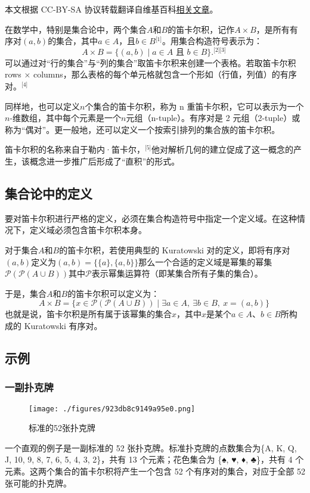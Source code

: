 
本文根据 CC-BY-SA 协议转载翻译自维基百科\href{https://en.wikipedia.org/wiki/Cartesian_product}{相关文章}。

在数学中，特别是集合论中，两个集合\(A\)和\(B\)的笛卡尔积，记作\( A \times B \)，是所有有序对\( (a, b) \)的集合，其中\( a \in A \)，且\( b \in B \)\(^\text{[1]}\)。用集合构造符号表示为：  
\[
A \times B = \{ (a, b) \mid a \in A \text{ 且 } b \in B \}.^\text{[2][3]}~
\]
可以通过对“行的集合”与“列的集合”取笛卡尔积来创建一个表格。若取笛卡尔积 rows × columns，那么表格的每个单元格就包含一个形如（行值，列值）的有序对。\(^\text{[4]}\)

同样地，也可以定义\(n\)个集合的笛卡尔积，称为 n 重笛卡尔积，它可以表示为一个\(n\)-维数组，其中每个元素是一个\(n\)元组（n-tuple）。有序对是 2 元组（2-tuple）或称为“偶对”。更一般地，还可以定义一个按索引排列的集合族的笛卡尔积。

笛卡尔积的名称来自于勒内·笛卡尔，\(^\text{[5]}\)他对解析几何的建立促成了这一概念的产生，该概念进一步推广后形成了“直积”的形式。
\subsection{集合论中的定义}
要对笛卡尔积进行严格的定义，必须在集合构造符号中指定一个定义域。在这种情况下，定义域必须包含笛卡尔积本身。

对于集合\( A \)和\( B \)的笛卡尔积，若使用典型的 Kuratowski 对的定义，即将有序对\( (a, b) \)定义为\((a, b) = \{\{a\}, \{a, b\}\}\)那么一个合适的定义域是幂集的幂集\(\mathcal{P}(\mathcal{P}(A \cup B))\)其中\( \mathcal{P} \)表示幂集运算符（即某集合所有子集的集合）。

于是，集合\( A \)和\( B \)的笛卡尔积可以定义为：  
\[
A \times B = \{ x \in \mathcal{P}(\mathcal{P}(A \cup B)) \mid \exists a \in A,\ \exists b \in B,\ x = (a, b) \}~
\]  
也就是说，笛卡尔积是所有属于该幂集的集合\( x \)，其中\( x \)是某个\( a \in A \)、\( b \in B \)所构成的 Kuratowski 有序对。
\subsection{示例}  
\subsubsection{一副扑克牌}
\begin{figure}[ht]
\centering
\texttt{[image: ./figures/923db8c9149a95e0.png]}
\caption{标准的52张扑克牌} \label{fig_DKR_1}
\end{figure}
一个直观的例子是一副标准的 52 张扑克牌。标准扑克牌的点数集合为\{A, K, Q, J, 10, 9, 8, 7, 6, 5, 4, 3, 2\}，共有 13 个元素；花色集合为 \{♠, ♥, ♦, ♣\}，共有 4 个元素。这两个集合的笛卡尔积将产生一个包含 52 个有序对的集合，对应于全部 52 张可能的扑克牌。


